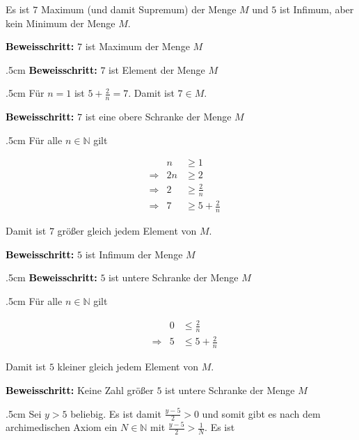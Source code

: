 \documentclass[fontsize=9pt,
               parskip=half-,
               DIV=14,
               listof=chapterentry,
               tocflat]{scrbook}
\newenvironment{indentblock}{\begin{adjustwidth}{.5cm}{}}{\end{adjustwidth}}
\newcommand{\proofstep}[1]{\textbf{\textcolor{Black}{#1}}}
\begin{document}
\begin{proof*}
Es ist $7$ Maximum (und damit Supremum) der Menge $M$ und $5$ ist Infimum, aber kein Minimum der Menge $M$.

\proofstep{Beweisschritt:}
 $7$ ist Maximum der Menge $M$\begin{indentblock}
\proofstep{Beweisschritt:}
 $7$ ist Element der Menge $M$\begin{indentblock}
Für $n=1$ ist $5+{\tfrac {2}{n}}=7$. Damit ist $7\in M$.

\end{indentblock}

\proofstep{Beweisschritt:}
 $7$ ist eine obere Schranke der Menge $M$\begin{indentblock}
Für alle $n\in \mathbb {N} $ gilt

\begin{align*}
&&n&\geq 1\\&\Rightarrow &2n&\geq 2\\&\Rightarrow &2&\geq {\tfrac {2}{n}}\\&\Rightarrow &7&\geq 5+{\tfrac {2}{n}}
\end{align*}

Damit ist $7$ größer gleich jedem Element von $M$.

\end{indentblock}

\end{indentblock}

\proofstep{Beweisschritt:}
 $5$ ist Infimum der Menge $M$\begin{indentblock}
\proofstep{Beweisschritt:}
 $5$ ist untere Schranke der Menge $M$\begin{indentblock}
Für alle $n\in \mathbb {N} $ gilt

\begin{align*}
&&0&\leq {\tfrac {2}{n}}\\&\Rightarrow &5&\leq 5+{\tfrac {2}{n}}
\end{align*}

Damit ist $5$ kleiner gleich jedem Element von $M$.

\end{indentblock}

\proofstep{Beweisschritt:}
 Keine Zahl größer $5$ ist untere Schranke der Menge $M$\begin{indentblock}
Sei $y>5$ beliebig. Es ist damit ${\tfrac {y-5}{2}}>0$ und somit gibt es nach dem archimedischen Axiom ein $N\in \mathbb {N} $ mit ${\tfrac {y-5}{2}}>{\tfrac {1}{N}}$. Es ist


\end{indentblock}
\end{indentblock}
\end{proof*}
\end{document}
